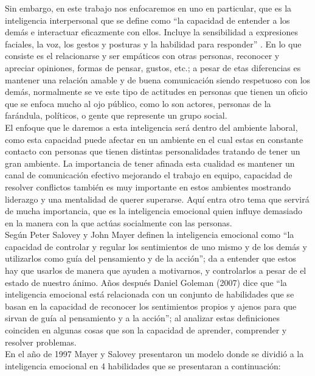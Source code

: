 Sin embargo, en este trabajo nos enfocaremos en uno en particular, que es la
inteligencia interpersonal que se define como “la capacidad de entender a los
demás e interactuar eficazmente con ellos. Incluye la sensibilidad a expresiones
faciales, la voz, los gestos y posturas y la habilidad para responder”
\parencite{gardnermultnin}. En lo que consiste es el relacionarse y ser
empáticos con otras personas, reconocer y apreciar opiniones, formas de pensar,
gustos, etc.; a pesar de etas diferencias es mantener una relación amable y de
buena comunicación siendo respetuoso con los demás, normalmente se ve este tipo
de actitudes en personas que tienen un oficio que se enfoca mucho al ojo
público, como lo son actores, personas de la farándula, políticos, o gente que
represente un grupo social.\\
El enfoque que le daremos a esta inteligencia será dentro del ambiente laboral,
como esta capacidad puede afectar en un ambiente en el cual estas en constante
contacto con personas que tienen distintas personalidades tratando de tener un
gran ambiente. La importancia de tener afinada esta cualidad es mantener un
canal de comunicación efectivo mejorando el trabajo en equipo, capacidad de
resolver conflictos también es muy importante en estos ambientes mostrando
liderazgo y una mentalidad de querer superarse. Aquí entra otro tema que servirá
de mucha importancia, que es la inteligencia emocional quien influye demasiado
en la manera con la que actúas socialmente con las personas.\\
Según Peter Salovey y John Mayer definen la inteligencia emocional como
“la capacidad de controlar y regular los sentimientos de uno mismo y de los
demás y utilizarlos como guía del pensamiento y de la acción”; da a entender que
estos hay que usarlos de manera que ayuden a motivarnos, y controlarlos a pesar
de el estado de nuestro ánimo. Años después Daniel Goleman (2007) dice que “la
inteligencia emocional está relacionada con un conjunto de habilidades que se
basan en la capacidad de reconocer los sentimientos propios y ajenos para que
sirvan de guía al pensamiento y a la acción”; al analizar estas definiciones
coinciden en algunas cosas que son la capacidad de aprender, comprender y
resolver problemas.\\
En el año de 1997 Mayer y Salovey presentaron un modelo donde se dividió a la
inteligencia emocional en 4 habilidades que se presentaran a continuación:
